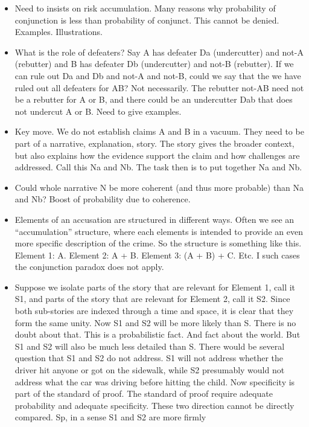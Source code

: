 \documentclass[
  10pt,
  dvipsnames,enabledeprecatedfontcommands]{scrartcl}
\begin{document}
\begin{itemize}
\item
  Need to insists on risk accumulation. Many reasons why probability of
  conjunction is less than probability of conjunct. This cannot be
  denied. Examples. Illustrations.
\item
  What is the role of defeaters? Say A has defeater Da (undercutter) and
  not-A (rebutter) and B has defeater Db (undercutter) and not-B
  (rebutter). If we can rule out Da and Db and not-A and not-B, could we
  say that the we have ruled out all defeaters for AB? Not necessarily.
  The rebutter not-AB need not be a rebutter for A or B, and there could
  be an undercutter Dab that does not undercut A or B. Need to give
  examples.
\item
  Key move. We do not establish claims A and B in a vacuum. They need to
  be part of a narrative, explanation, story. The story gives the
  broader context, but also explains how the evidence support the claim
  and how challenges are addressed. Call this Na and Nb. The task then
  is to put together Na and Nb.
\item
  Could whole narrative N be more coherent (and thus more probable) than
  Na and Nb? Boost of probability due to coherence.
\item
  Elements of an accusation are structured in different ways. Often we
  see an ``accumulation'' structure, where each elements is intended to
  provide an even more specific description of the crime. So the
  structure is something like this. Element 1: A. Element 2: A + B.
  Element 3: (A + B) + C. Etc. I such cases the conjunction paradox does
  not apply.
\item
  Suppose we isolate parts of the story that are relevant for Element 1,
  call it S1, and parts of the story that are relevant for Element 2,
  call it S2. Since both sub-stories are indexed through a time and
  space, it is clear that they form the same unity. Now S1 and S2 will
  be more likely than S. There is no doubt about that. This is a
  probabilistic fact. And fact about the world. But S1 and S2 will also
  be much less detailed than S. There would be several question that S1
  and S2 do not address. S1 will not address whether the driver hit
  anyone or got on the sidewalk, while S2 presumably would not address
  what the car was driving before hitting the child. Now specificity is
  part of the standard of proof. The standard of proof require adequate
  probability and adequate specificity. These two direction cannot be
  directly compared. Sp, in a sense S1 and S2 are more firmly

\end{itemize}
\end{document}
